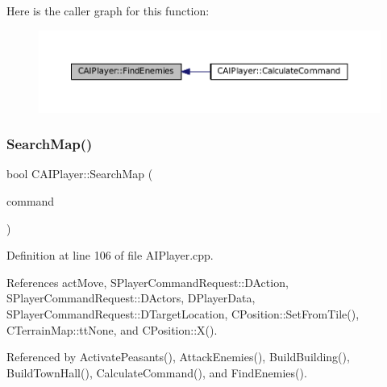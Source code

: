 Here is the caller graph for this function\+:\nopagebreak
\begin{figure}[H]
\begin{center}
\leavevmode
\includegraphics[width=350pt]{classCAIPlayer_a33b1533570e7a00114d1b85b3551e395_icgraph}
\end{center}
\end{figure}
\hypertarget{classCAIPlayer_afafbe8fc589e09a16ae1f02f2794d7b0}{}\label{classCAIPlayer_afafbe8fc589e09a16ae1f02f2794d7b0} 
\subsubsection{\texorpdfstring{Search\+Map()}{SearchMap()}}
{\footnotesize\ttfamily bool C\+A\+I\+Player\+::\+Search\+Map (\begin{DoxyParamCaption}\item[{\hyperlink{structSPlayerCommandRequest}{S\+Player\+Command\+Request} \&}]{command }\end{DoxyParamCaption})\hspace{0.3cm}{\ttfamily [protected]}}



Definition at line 106 of file A\+I\+Player.\+cpp.



References act\+Move, S\+Player\+Command\+Request\+::\+D\+Action, S\+Player\+Command\+Request\+::\+D\+Actors, D\+Player\+Data, S\+Player\+Command\+Request\+::\+D\+Target\+Location, C\+Position\+::\+Set\+From\+Tile(), C\+Terrain\+Map\+::tt\+None, and C\+Position\+::\+X().



Referenced by Activate\+Peasants(), Attack\+Enemies(), Build\+Building(), Build\+Town\+Hall(), Calculate\+Command(), and Find\+Enemies().


